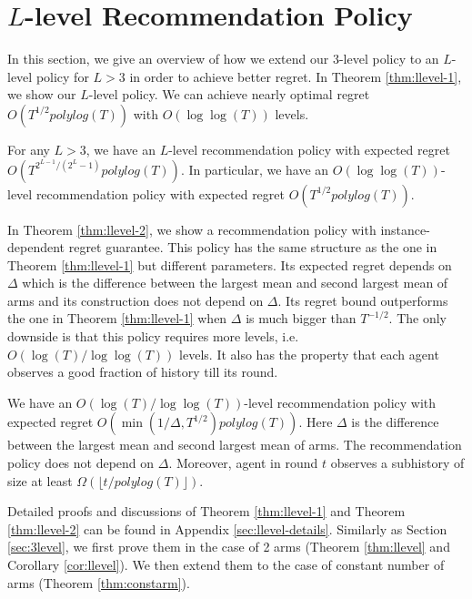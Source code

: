 
\section{$L$-level Recommendation Policy}
\label{sec:llevel}
In this section, we give an overview of how we extend our 3-level policy to an $L$-level policy for $L > 3$ in order to achieve better regret. In Theorem \ref{thm:llevel-1}, we show our $L$-level policy. We can achieve nearly optimal regret $O(T^{1/2} polylog(T))$ with $O(\log\log(T))$ levels.
\begin{theorem}
\label{thm:llevel-1}
For any $L > 3$, we have an $L$-level recommendation policy with expected regret \\$O\left(T^{2^{L-1}/(2^L-1)} polylog(T) \right)$. In particular, we have an $O(\log\log(T))$-level recommendation policy with expected regret $O(T^{1/2} polylog(T))$. 
\end{theorem}

In Theorem \ref{thm:llevel-2}, we show a recommendation policy with instance-dependent regret guarantee. This policy has the same structure as the one in Theorem \ref{thm:llevel-1} but different parameters. Its expected regret depends on $\Delta$ which is the difference between the largest mean and second largest mean of arms and its construction does not depend on $\Delta$. Its regret bound outperforms the one in Theorem \ref{thm:llevel-1} when $\Delta$ is much bigger than $T^{-1/2}$. The only downside is that this policy requires more levels, i.e. $O(\log(T)/\log\log(T))$ levels. It also has the property that each agent observes a good fraction of history till its round. 

\begin{theorem}
\label{thm:llevel-2}
 We have an $O(\log(T)/\log\log(T))$-level recommendation policy with expected regret $O(\min(1/\Delta, T^{1/2})polylog(T))$. Here $\Delta$ is the difference between the largest mean and second largest mean of arms. The recommendation policy does not depend on $\Delta$. Moreover, agent in round $t$ observes a subhistory of size at least $\Omega( \lfloor t/polylog(T)\rfloor)$. 
\end{theorem}

Detailed proofs and discussions of Theorem \ref{thm:llevel-1} and Theorem \ref{thm:llevel-2} can be found in Appendix \ref{sec:llevel-details}. Similarly as Section \ref{sec:3level}, we first prove them in the case of 2 arms (Theorem \ref{thm:llevel} and Corollary \ref{cor:llevel}). We then extend them to the case of constant number of arms (Theorem \ref{thm:constarm}).

